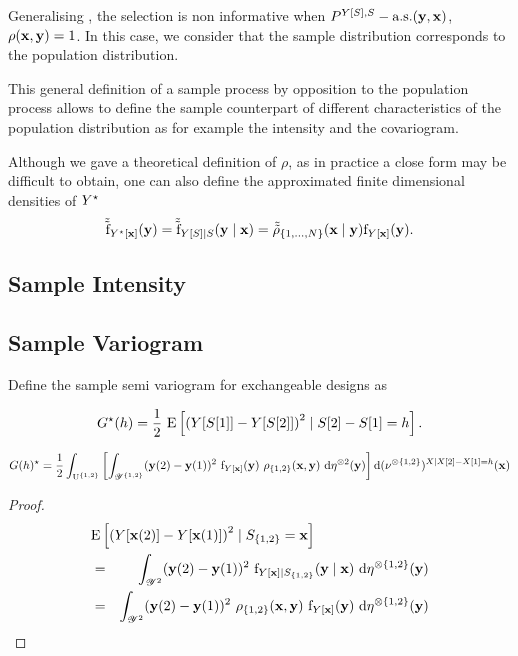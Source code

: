 Generalising \cite{pfefferman_1992}, the selection is non informative when $P^{Y[S],S}-\text{a.s.}(\mathbf{y},\mathbf{x})$, $\rho(\mathbf{x},\mathbf{y})=1$. In this case, we consider that the sample distribution corresponds to the population distribution.



This general definition of a sample process by opposition to the population process allows to define the sample counterpart of different characteristics of the population distribution as for example the intensity and the covariogram.

Although we gave a theoretical definition of $\rho$, as in practice a close form may be difficult to obtain, one can also define the approximated finite dimensional densities of $Y^\star$ 
$$\tilde{\tilde{\mathrm{f}}}_{Y^\star[\mathbf{x}]}(\mathbf{y})=\tilde{\tilde{\mathrm{f}}}_{Y[S]\mid S}(\mathbf{y}\mid\mathbf{x})=
\tilde{\tilde{\rho}}_{\{1,\ldots,N\}}(\mathbf{x}\mid\mathbf{y})\mathrm{f}_{Y[\mathbf{x}]}(\mathbf{y}).$$

\subsection{Sample Intensity}

\subsection{Sample Variogram}
Define the sample semi variogram for exchangeable designs as 

$$G^\star(h)=\frac12~\mathrm{E}\left[\left(Y[S[1]]-Y[S[2]]\right)^2\mid S[2]-S[1]=h\right].$$

\begin{property}
$$G(h)^\star=\frac12\int_{\mathrm{U}^{\{1,2\}}} \left[\int_{\mathscr{Y}^{\{1,2\}}} (\mathbf{y}(2)-\mathbf{y}(1))^2~ \mathrm{f}_{Y[\mathbf{x}]}(\mathbf{y})~
\rho_{\{1,2\}}(\mathbf{x},\mathbf{y})~
\mathrm{d}\eta^{\otimes 2}(\mathbf{y})
\right] \mathrm{d}(\nu^{\otimes\{1, 2\}})^{X\mid X[2]-X[1]=h}(\mathbf{x})$$


\end{property}

\begin{proof}

\begin{eqnarray*}
\lefteqn{\E\left[\left(\Signal[\position(2)]-\Signal[\position(1)]\right)^2\mid \Sample_{\{1,2\}}=\position\right]}\\
&=&\int_{\range{\Signal}^2} (\signal(2)-\signal(1))^2~
\density_{\Signal[\position]\mid S_{\{1,2\}}}(\signal\mid \position)~
\derive\dominantY^{\otimes\{1, 2\}}(\signal) \\
&=&\int_{\range{\Signal}^2} (\signal(2)-\signal(1))^2~
\rho_{\{1,2\}}(\position,\signal)~ \density_{\Signal[\position]}(\signal)~
\derive\dominantY^{\otimes\{1, 2\}}(\signal) \\
\end{eqnarray*}


\end{proof}

